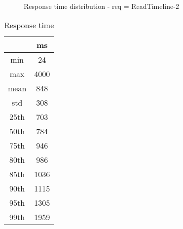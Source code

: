\begin{minipage}{0.75\linewidth}
\begin{figure}[h]
\begin{adjustbox}{max width=1.0\linewidth, keepaspectratio}
  \end{adjustbox}
  \caption{Response time distribution - req = ReadTimeline-2}
\end{figure}
\end{minipage}\hfill\begin{minipage}{0.18\linewidth}
\begin{table}[h]
\begin{tabular}{|cc|}
\hline
\textbf{} & \textbf{ms}\\ \hline
 \Xhline{0.005\arrayrulewidth}
min & 24\\
 \Xhline{0.005\arrayrulewidth}
max & 4000\\
 \Xhline{0.005\arrayrulewidth}
mean & 848\\
 \Xhline{0.005\arrayrulewidth}
std & 308\\
\hline
\hline
 \Xhline{0.005\arrayrulewidth}
25th & 703\\
 \Xhline{0.005\arrayrulewidth}
50th & 784\\
 \Xhline{0.005\arrayrulewidth}
75th & 946\\
 \Xhline{0.005\arrayrulewidth}
80th & 986\\
 \Xhline{0.005\arrayrulewidth}
85th & 1036\\
 \Xhline{0.005\arrayrulewidth}
90th & 1115\\
 \Xhline{0.005\arrayrulewidth}
95th & 1305\\
 \Xhline{0.005\arrayrulewidth}
99th & 1959\\
\hline
\end{tabular}
\caption{Response time}
\end{table}
\end{minipage}\hfill